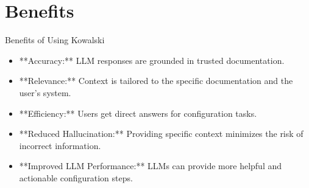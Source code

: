 \documentclass[aspectratio=169]{beamer}
\begin{document}
\section{Benefits}
\begin{frame}{Benefits of Using Kowalski}
  \begin{itemize}
    \item **Accuracy:** LLM responses are grounded in trusted documentation.
    \item **Relevance:** Context is tailored to the specific documentation and the user's system.
    \item **Efficiency:** Users get direct answers for configuration tasks.
    \item **Reduced Hallucination:** Providing specific context minimizes the risk of incorrect information.
    \item **Improved LLM Performance:** LLMs can provide more helpful and actionable configuration steps.
  \end{itemize}
\end{frame}

\end{document}
